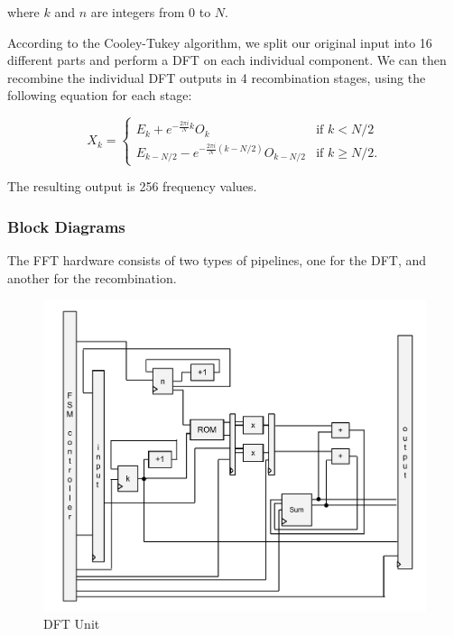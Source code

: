 \documentclass{article}
\begin{document}
	where \(k\) and \(n\) are integers from 0 to \(N\). 
	
	According to the Cooley-Tukey algorithm, 
	we split our original input into 16 different parts and perform a DFT on each
	individual component. We can then recombine the individual DFT outputs in 4
	recombination stages, using the following equation for each stage: 
	
	\begin{equation}
		X_k = \left\{
		\begin{matrix}
			E_k + e^{-\frac{2\pi i}{N}k} O_k		& 	\mbox{if } k < N/2 \\ 
			E_{k-N/2} - e^{-\frac{2\pi i}{N} (k-N/2)} O_{k-N/2} & 	\mbox{if }
			k \geq N/2. 
		\end{matrix} 
		\right.
	\end{equation}
	
	The resulting output is 256 frequency values.
	
	\subsubsection{Block Diagrams}

	The FFT hardware consists of two types of pipelines, one for the DFT,
	and another for the recombination.

	\begin{figure}[H]
		\caption{DFT Unit}
		\centering
		\includegraphics[scale=0.375]{dft-unit}
	\end{figure}
\end{document}
